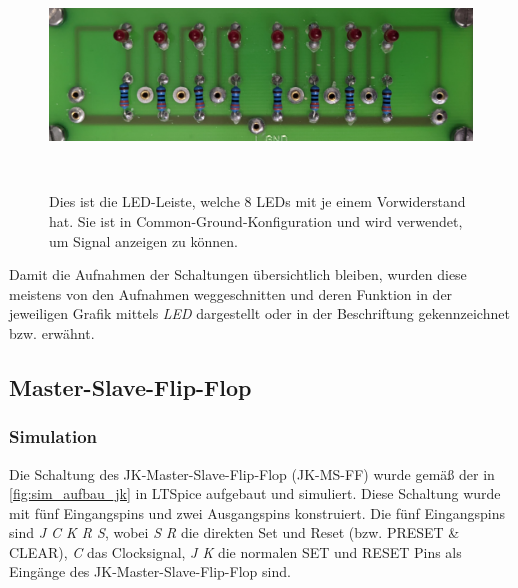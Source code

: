 \documentclass[12pt,english,ngerman]{scrartcl}
\begin{document}
\begin{figure}[H]
  \centering
  \includegraphics[width=\textwidth, height=6cm,keepaspectratio]{./figures/messungen/ledleiste.jpg}
  \caption{Dies ist die LED-Leiste, welche 8 LEDs mit je einem Vorwiderstand
  hat. Sie ist in Common-Ground-Konfiguration und wird verwendet, um Signal
  anzeigen zu können.}
  \label{fig:aufbau_led}
\end{figure}

Damit die Aufnahmen der Schaltungen übersichtlich bleiben, wurden diese meistens
von den Aufnahmen weggeschnitten und deren Funktion in der jeweiligen Grafik
mittels \textit{LED} dargestellt oder in der Beschriftung gekennzeichnet bzw.
erwähnt.


\subsection{Master-Slave-Flip-Flop}


\subsubsection{Simulation}

Die Schaltung des JK-Master-Slave-Flip-Flop (JK-MS-FF) wurde gemäß der
 in \autoref{fig:sim_aufbau_jk} in
LTSpice aufgebaut und simuliert. Diese Schaltung wurde mit fünf Eingangspins
und zwei Ausgangspins konstruiert. Die fünf Eingangspins sind \textit{J C K R S},
wobei \textit{S R} die direkten Set und Reset (bzw. PRESET \& CLEAR), \textit{C} das
Clocksignal, \textit{J K} die normalen SET und RESET Pins als Eingänge des
JK-Master-Slave-Flip-Flop sind. 
\end{document}
